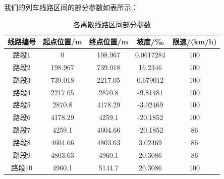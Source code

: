 \documentclass[12pt,a4paper]{nmmcm}
\begin{document}
我们的列车线路区间的部分参数如表所示：
\begin{table}[H]
\centering
\caption{各离散线路区间部分参数}
\label{bh}
\begin{tabular}{ccccc}
\hline
\textbf{线路编号} & \textbf{起点位置/m} & \textbf{终点位置/m} & \textbf{坡度/‰} & \textbf{限速/(km/h)} \\ \hline
路段1           & 0               & 198.967         & 0.0617284     & 100                \\
路段2           & 198.967         & 739.018         & 16.2346       & 100                \\
路段3           & 739.018         & 2217.05         & 0.679012      & 100                \\
路段4           & 2217.05         & 2870.8          & -9.81481      & 100                \\
路段5           & 2870.8          & 4178.29         & -3.02469      & 100                \\
路段6           & 4178.29         & 4259.1          & -20.1852      & 100                \\
路段7           & 4259.1          & 4604.66         & -20.1852      & 86                 \\
路段8           & 4604.66         & 4803.63         & 3.02469       & 86                 \\
路段9           & 4803.63         & 4960.1          & 20.3086       & 86                 \\
路段10          & 4960.1          & 5144.7          & 20.3086       & 100                \\ \hline
\end{tabular}
\end{table}
\end{document}
